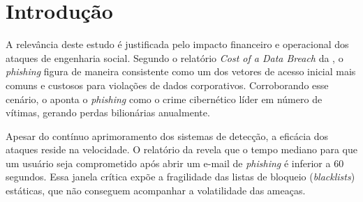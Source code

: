 \documentclass[a4paper,12pt]{article}
\newcommand{\keyword}[1]{\textsf{#1}}
\begin{document}
\newpage 
{}
\begin{abstract}
\textit{Phishing} remains one of the most critical cyber threats, exploiting user trust to steal credentials. Traditional defenses based on static blacklists are ineffective against the rapid turnover of malicious URLs in zero-hour attacks. This work proposes the development of a real-time detection system composed of a browser extension and a cloud-based analysis API. The methodology adopts a hybrid approach combining Information Retrieval techniques, specifically the Vector Space Model with TF-IDF weighting and Cosine Similarity, applied to a proprietary database, integrated with a collaborative validation module (crowdsourcing). The architecture utilizes Google Compute Engine for intensive vector processing and Google Firestore for dynamic URL reputation management based on community consensus. The proposed solution aims to reduce latency in identifying new threats and minimize false positive rates through continuous user feedback.
\\\textbf{\keyword{Keywords: }} Phishing. Information Retrieval. Crowdsourcing. Web Security. Real-Time Detection.
\end{abstract}

\newpage

 \onehalfspace  %
 \setlength{\parindent}{1.25cm}


\section{Introdução}
\label{sec:Intro}

A relevância deste estudo é justificada pelo impacto financeiro e operacional dos ataques de engenharia social. Segundo o relatório \textit{Cost of a Data Breach} da , o \textit{phishing} figura de maneira consistente como um dos vetores de acesso inicial mais comuns e custosos para violações de dados corporativos. Corroborando esse cenário, o  aponta o \textit{phishing} como o crime cibernético líder em número de vítimas, gerando perdas bilionárias anualmente.

Apesar do contínuo aprimoramento dos sistemas de detecção, a eficácia dos ataques reside na velocidade. O relatório da  revela que o tempo mediano para que um usuário seja comprometido após abrir um e-mail de \textit{phishing} é inferior a 60 segundos. Essa janela crítica expõe a fragilidade das listas de bloqueio (\textit{blacklists}) estáticas, que não conseguem acompanhar a volatilidade das ameaças.
\end{document}

